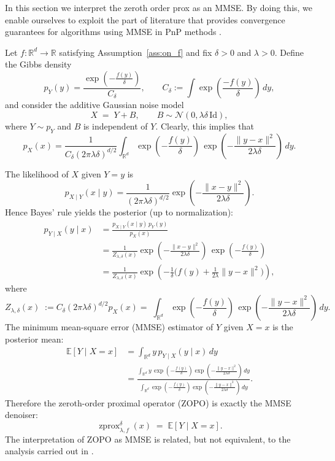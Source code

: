 \documentclass{article}
\newcommand{\zprox}{\ensuremath{\operatorname{zprox}}}
\begin{document}
In this section we interpret the zeroth order prox as an MMSE. By doing this, we enable ourselves to exploit the part of literature that provides convergence guarantees for algorithms using MMSE in PnP methods \cite{Gribonval11,Gribonval2013,xu-2020-provable}.


Let $f:\mathbb{R}^d\to\mathbb{R}$ satisfying Assumption~\ref{ass:on_f} and fix $\delta>0$ and $\lambda>0$.
Define the Gibbs density
\begin{equation}\label{eq:Cdelta}
    p_Y(y)=\frac{\exp\!\left(-\frac{f(y)}{\delta}\right)}{C_{\delta}}, \qquad C_{\delta}:= \int \exp\left(\frac{-f(y)}{\delta}\right)\, dy,
\end{equation}
and consider the additive Gaussian noise model
\[
X \;=\; Y + B,\qquad B \sim\mathcal N(0,\lambda\delta \, \mathrm{Id}),
\]
where $Y\sim p_Y$ and $B$ is independent of $Y$. Clearly, this implies that
\begin{equation}
p_X(x) =\frac{1}{C_\delta (2\pi\lambda \delta)^{d/2}}\int_{\mathbb{R}^d}\exp\!\left(-\frac{f(y)}{\delta}\right)\,
\exp\!\left(-\frac{\|y-x\|^2}{2\lambda\delta}\right)\,dy.
\end{equation}

The likelihood of $X$ given $Y=y$ is
\[
p_{X\mid Y}(x\mid y)
=\frac{1}{(2\pi\lambda\delta)^{d/2}}
\exp\!\left(-\frac{\|x-y\|^2}{2\lambda\delta}\right).
\]
Hence Bayes' rule yields the posterior (up to normalization):
\begin{align*}
p_{Y\mid X}(y\mid x)
&= \frac{p_{X\mid Y}(x\mid y)\,p_Y(y)}{p_X(x)} \\
&= \frac{1}{Z_{\lambda,\delta}(x)}\exp\!\left(-\frac{\|x-y\|^2}{2\lambda\delta}\right)\,
       \exp\!\left(-\frac{f(y)}{\delta}\right)\\
&=\frac{1}{Z_{\lambda,\delta}(x)}\exp\!\left(
-\frac{1}{\delta}\Big(f(y)+\frac{1}{2\lambda}\|y-x\|^2\Big)
\right),
\end{align*}
where
\begin{equation}
Z_{\lambda,\delta}(x)\;:= C_\delta (2\pi\lambda \delta)^{d/2} p_X(x) =\;\int_{\mathbb{R}^d}\exp\!\left(-\frac{f(y)}{\delta}\right)\,
\exp\!\left(-\frac{\|y-x\|^2}{2\lambda\delta}\right)\,dy.
\label{eq:Zz}
\end{equation}
The minimum mean-square error (MMSE) estimator of $Y$ given $X=x$ is the posterior mean:
\begin{align*}
\mathbb{E}[Y\mid X=x]
&=\int_{\mathbb{R}^d} y\,p_{Y\mid X}(y\mid x)\,dy \\
&=\frac{\int_{\mathbb{R}^d} y\,\exp\!\left(-\frac{f(y)}{\delta}\right)\exp\!\left(-\frac{\|y-x\|^2}{2\lambda\delta}\right)\,dy}
        {\int_{\mathbb{R}^d}   \exp\!\left(-\frac{f(y)}{\delta}\right)\exp\!\left(-\frac{\|y-x\|^2}{2\lambda\delta}\right)\,dy}.
\end{align*}
Therefore the zeroth-order proximal operator (ZOPO) is exactly the MMSE denoiser:
\[
\zprox_{\lambda, f}^{\delta}(x)\;=\;\mathbb{E}[Y\mid X=x].
\]
The interpretation of ZOPO as MMSE is related, but not equivalent, to the analysis carried out in \cite{darbon2021connecting}.
\end{document}
